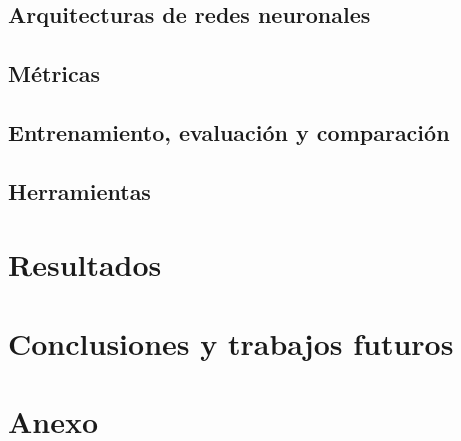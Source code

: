 \documentclass[a4paper,12pt,spanish]{book}
\begin{document}
\section{Arquitecturas de redes neuronales}


\section{Métricas} \label{sec:metricas}


\section{Entrenamiento, evaluación y comparación} \label{sec:comparacion}


\section{Herramientas}


\chapter{Resultados} \label{chap:resultados}









\chapter{Conclusiones y trabajos futuros}


\newpage
\footnotesize
\printbibliography[heading=bibintoc]

\chapter*{Anexo}
\label{chap:anexo}


\newpage
\newpage
\vfill
\addtocounter{page}{-1}
\clearpage
\thispagestyle{empty}
\phantom{a}
\vfill
\newpage
\vfill
\addtocounter{page}{-1}
\end{document}
